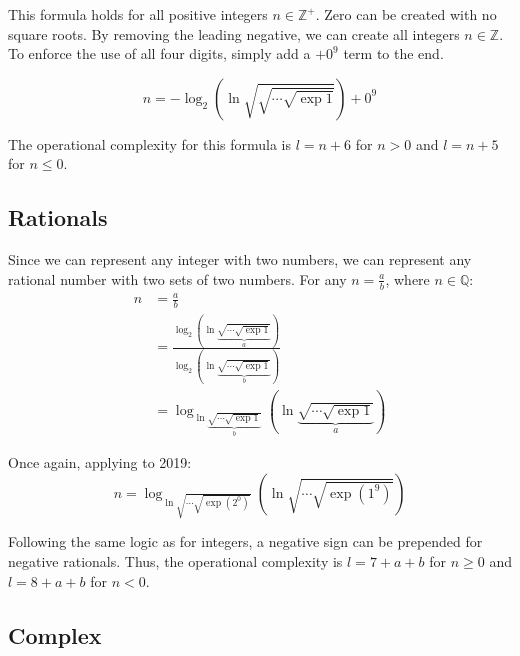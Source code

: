 This formula holds for all positive integers $n\in\mathbb{Z}^+$.
Zero can be created with no square roots.
By removing the leading negative, we can create all integers $n\in\mathbb{Z}$.
To enforce the use of all four digits, simply add a $+0^9$ term to the end.

\begin{equation}
  n = -\log_2\left( \ln \sqrt{\sqrt{\cdots\sqrt{\exp1}}}\right)+0^9
\end{equation}

The operational complexity for this formula is $l=n+6$ for $n>0$ and $l=n+5$ for $n\leq0$.

\subsection{Rationals}
Since we can represent any integer with two numbers, we can represent any rational number with two sets of two numbers.
For any $n=\frac{a}{b}$, where $n\in\mathbb{Q}$:
\begin{align*}
  n &= \frac{a}{b} \\
  &= \frac{
      \log_2\left(
        \ln \underbrace{\sqrt{\cdots\sqrt{\exp1}}}_{a} 
      \right)
    }{
      \log_2\left(
        \ln \underbrace{\sqrt{\cdots\sqrt{\exp1}}}_{b} 
      \right)
    } \\
  &= \log_{
      \ln \underbrace{\sqrt{\cdots\sqrt{\exp1}}}_{b}
    }
    \left(
      \ln \underbrace{\sqrt{\cdots\sqrt{\exp1}}}_{a}
    \right)
\end{align*}

Once again, applying to 2019:
\begin{equation}
  n = \log_{
      \ln\sqrt{\cdots\sqrt{\exp(2^0)}}
    }
    \left(
      \ln\sqrt{\cdots\sqrt{\exp(1^9)}}
    \right)
\end{equation}

Following the same logic as for integers, a negative sign can be prepended for negative rationals.
Thus, the operational complexity is $l=7+a+b$ for $n\geq0$ and $l=8+a+b$ for $n<0$.

\subsection{Complex}
